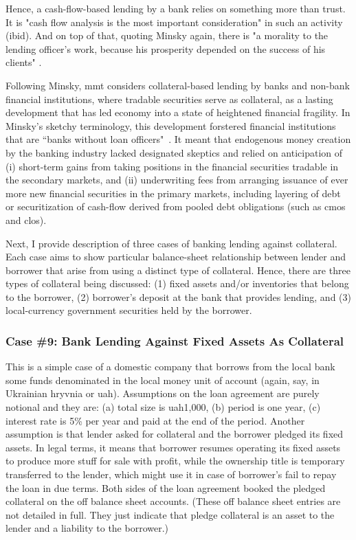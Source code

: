 Hence,  a cash-flow-based lending by a bank relies on something more than trust. It is "cash flow analysis is the most important consideration" in such an activity (ibid). And on top of that, quoting Minsky again, there is "a morality to the lending officer's work, because his prosperity depended on the success of his clients" \citep{mayer2010}.

Following Minsky, \ac{mmt} considers collateral-based lending by banks and non-bank financial institutions, where tradable securities serve as collateral, as a lasting development that has led economy into a state of heightened financial fragility. In Minsky's sketchy terminology, this development forstered financial institutions that are ``banks without loan officers"~\citep[p.~127]{tymoigne2009}. It meant that endogenous money creation by the banking industry lacked designated skeptics and relied on anticipation of (i) short-term gains from taking positions in the financial securities tradable in the secondary markets, and (ii) underwriting fees from arranging issuance of ever more new financial securities in the primary markets, including layering of debt or securitization of cash-flow derived from pooled debt obligations (such as \acfp{cmo} and \acfp{clo}).    

Next, I provide description of three cases of banking lending against collateral. Each case aims to show particular balance-sheet relationship between lender and borrower that arise from using a distinct type of collateral. Hence, there are three types of collateral being discussed: (1) fixed assets and/or inventories that belong to the borrower, (2) borrower's deposit at the bank that provides lending, and (3) local-currency government securities held by the borrower. 

\subsubsection*{Case \#9: Bank Lending Against Fixed Assets As Collateral}

This is a simple case of a domestic company that borrows from the local bank some funds denominated in the local money unit of account (again, say, in Ukrainian hryvnia or \ac{uah}). Assumptions on the loan agreement are purely notional and they are: (a) total size is \ac{uah}1,000, (b) period is one year, (c) interest rate is 5\% per year and paid at the end of the period. Another assumption is that lender asked for collateral and the borrower pledged its fixed assets. In legal terms, it means that borrower resumes operating its fixed assets to produce more stuff for sale with profit, while the ownership title is temporary transferred to the lender, which might use it in case of borrower's fail to repay the loan in due terms. Both sides of the loan agreement booked the pledged collateral on the off balance sheet accounts. (These off balance sheet entries are not detailed in full. They just indicate that pledge collateral is an asset to the lender and a liability to the borrower.)


